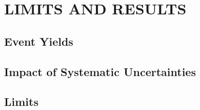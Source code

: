 %
%
%


\chapter{\uppercase {Limits and Results}}
\label{ch:results}

\section{Event Yields}
\section{Impact of Systematic Uncertainties}
\section{Limits}

\begin{comment}
begin{figure}[!hbt]
	\centering
	\begin{subfigure}[t]{0.46\textwidth}
		\texttt{[image: \\figpath/Chapter4/2015\_08\_01\_combinedSM\_KinMEBDT\_StatsOnly.pdf]}
		\label{fig:limits_stats_only}
	\end{subfigure}
	\begin{subfigure}[t]{0.46\textwidth}
		\texttt{[image: \\figpath/Chapter4/2015\_08\_01\_combinedSM\_KinMEBDT.pdf]}
		\label{fig:limits_with_sys}
	\end{subfigure}
	\caption{Expected 95\% upper confidence level on the Higgs signal strength (left) without including systematic uncertainties and (right) with systematic uncertainties included. The median combined limit is found to be 2.01 without systematics and 3.48 with them.}
	\label{fig:limits}
\end{figure}
\end{comment}